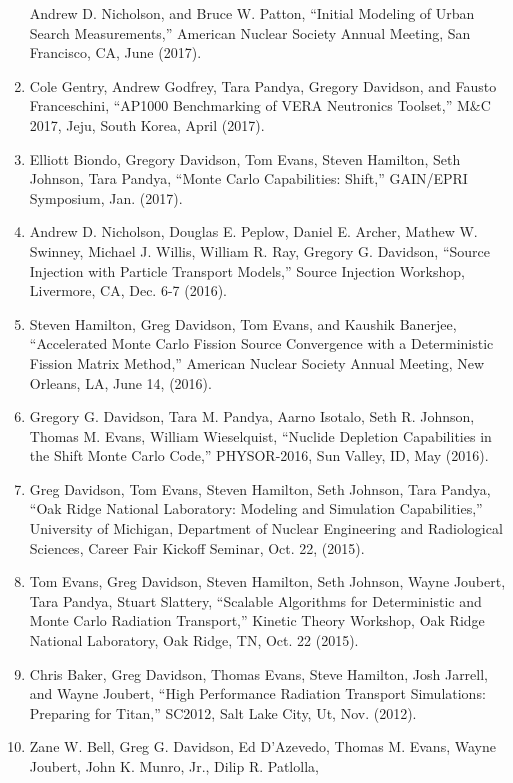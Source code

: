 \documentclass[letterpaper,11pt]{article}
\begin{document}
\begin{enumerate}
    Andrew D. Nicholson, and Bruce W. Patton, ``Initial Modeling of
    Urban Search Measurements,'' American Nuclear Society Annual
    Meeting, San Francisco, CA, June (2017).
  \item Cole Gentry, Andrew Godfrey, Tara Pandya, Gregory Davidson,
    and Fausto Franceschini, ``AP1000 Benchmarking of VERA Neutronics
    Toolset,'' M\&C 2017, Jeju, South Korea, April (2017).
  \item Elliott Biondo, Gregory Davidson, Tom Evans, Steven
    Hamilton, Seth Johnson, Tara Pandya, ``Monte Carlo Capabilities:
    Shift,'' GAIN/EPRI Symposium, Jan. (2017).
  \item Andrew D. Nicholson, Douglas E. Peplow, Daniel E. Archer,
    Mathew W. Swinney, Michael J. Willis, William R. Ray, Gregory
    G. Davidson, ``Source Injection with Particle Transport
    Models,'' Source Injection Workshop, Livermore, CA, Dec. 6-7
    (2016).
  \item Steven Hamilton, Greg Davidson, Tom Evans, and Kaushik
    Banerjee, ``Accelerated Monte Carlo Fission Source Convergence
    with a Deterministic Fission Matrix Method,'' American Nuclear
    Society Annual Meeting, New Orleans, LA, June 14, (2016).
  \item Gregory G. Davidson, Tara M. Pandya, Aarno Isotalo, Seth
    R. Johnson, Thomas M. Evans, William Wieselquist, ``Nuclide
    Depletion Capabilities in the Shift Monte Carlo Code,''
    PHYSOR-2016, Sun Valley, ID, May (2016).
  \item Greg Davidson, Tom Evans, Steven Hamilton, Seth Johnson,
    Tara Pandya, ``Oak Ridge National Laboratory: Modeling and
    Simulation Capabilities,'' University of Michigan, Department of
    Nuclear Engineering and Radiological Sciences, Career Fair
    Kickoff Seminar, Oct. 22, (2015).
  \item Tom Evans, Greg Davidson, Steven Hamilton, Seth Johnson,
    Wayne Joubert, Tara Pandya, Stuart Slattery, ``Scalable
    Algorithms for Deterministic and Monte Carlo Radiation
    Transport,'' Kinetic Theory Workshop, Oak Ridge National
    Laboratory, Oak Ridge, TN, Oct. 22 (2015).
  \item Chris Baker, Greg Davidson, Thomas Evans, Steve Hamilton,
    Josh Jarrell, and Wayne Joubert, ``High Performance Radiation
    Transport Simulations: Preparing for Titan,'' SC2012, Salt Lake
    City, Ut, Nov. (2012).
  \item Zane W. Bell, Greg G. Davidson, Ed D'Azevedo, Thomas
    M. Evans, Wayne Joubert, John K. Munro, Jr., Dilip R. Patlolla,

\end{enumerate}
\end{document}
